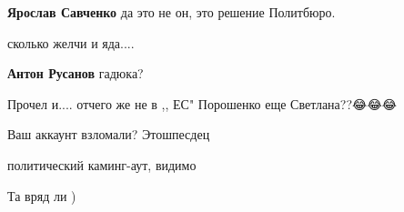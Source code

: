\begin{itemize}
\begin{itemize}
\textbf{Ярослав Савченко} да это не он, это решение Политбюро.
\end{itemize}

 
сколько желчи и яда....

\begin{itemize}
 
\textbf{Антон Русанов} гадюка?
\end{itemize}

 

Прочел и.... отчего же не в ,, ЕС" Порошенко еще Светлана??😂😂😂

 

Ваш аккаунт взломали? Этошпесдец

\begin{itemize}
 
политический каминг-аут, видимо

 
Та вряд ли )

 

\end{itemize}
\end{itemize}
